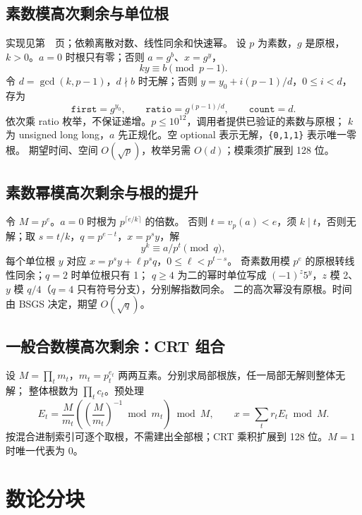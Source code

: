 

\subsection{素数模高次剩余与单位根}\label{knowledge-higher-residue}
实现见第~\pageref{compact-KthResidue}~页；依赖离散对数、线性同余和快速幂。
设 $p$ 为素数，$g$ 是原根，$k>0$。$a=0$ 时根只有零；否则 $a=g^b$、$x=g^y$，
\[
ky\equiv b\pmod{p-1}.
\]
令 $d=\gcd(k,p-1)$，$d\nmid b$ 时无解；否则 $y=y_0+i(p-1)/d$，$0\le i<d$，存为
\[
\texttt{first}=g^{y_0},\qquad
\texttt{ratio}=g^{(p-1)/d},\qquad \texttt{count}=d.
\]
依次乘 ratio 枚举，不保证递增。$p\le10^{12}$，调用者提供已验证的素数与原根；
$k$ 为 unsigned long long，$a$ 先正规化。空 optional 表示无解，\texttt{\{0,1,1\}} 表示唯一零根。
期望时间、空间 $O(\sqrt p)$，枚举另需 $O(d)$；模乘须扩展到 128 位。



\subsection{素数幂模高次剩余与根的提升}\label{knowledge-prime-power-residue}
令 $M=p^e$。$a=0$ 时根为 $p^{\lceil e/k\rceil}$ 的倍数。
否则 $t=v_p(a)<e$，须 $k\mid t$，否则无解；取 $s=t/k$，$q=p^{e-t}$，$x=p^s y$，解
\[
y^k\equiv a/p^t\pmod q,
\]
每个单位根 $y$ 对应 $x=p^s y+\ell p^s q$，$0\le\ell<p^{t-s}$。
奇素数用模 $p^e$ 的原根转线性同余；$q=2$ 时单位根只有 1；
$q\ge4$ 为二的幂时单位写成 $(-1)^z5^y$，$z$ 模 2、$y$ 模 $q/4$（$q=4$ 只有符号分支），分别解指数同余。
二的高次幂没有原根。时间由 BSGS 决定，期望 $O(\sqrt q)$。



\subsection{一般合数模高次剩余：CRT 组合}\label{knowledge-composite-residue}
设 $M=\prod_t m_t$，$m_t=p_t^{e_t}$ 两两互素。分别求局部根族，任一局部无解则整体无解；
整体根数为 $\prod_t c_t$。预处理
\[
E_t=\frac M{m_t}\left(\left(\frac M{m_t}\right)^{-1}\bmod m_t\right)\bmod M,
\qquad x=\sum_t r_tE_t\bmod M.
\]
按混合进制索引可逐个取根，不需建出全部根；CRT 乘积扩展到 128 位。$M=1$ 时唯一代表为 0。



\Needspace{180pt}

\section{数论分块}

